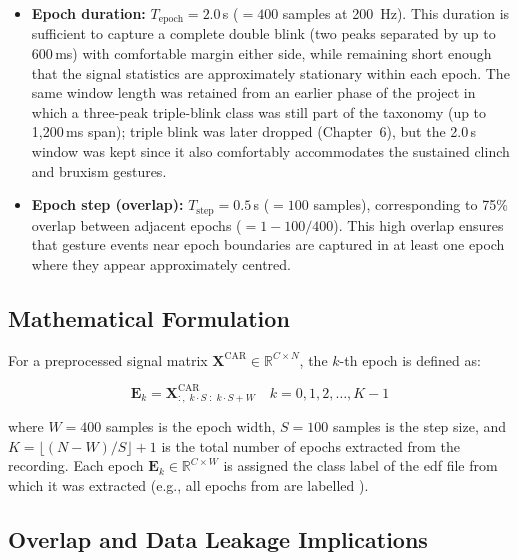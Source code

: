\begin{itemize}[leftmargin=*]
    \item \textbf{Epoch duration:} $T_{\text{epoch}} =
    2.0$\,s ($= 400$ samples at \SI{200}{\hertz}). This
    duration is sufficient to capture a complete double blink
    (two peaks separated by up to 600\,ms) with comfortable
    margin either side, while remaining short enough that the
    signal statistics are approximately stationary within each
    epoch. The same window length was retained from an earlier
    phase of the project in which a three-peak triple-blink
    class was still part of the taxonomy (up to 1{,}200\,ms
    span); triple blink was later dropped
    (Chapter~6), but the 2.0\,s window was kept since it also
    comfortably accommodates the sustained clinch and bruxism
    gestures.

    \item \textbf{Epoch step (overlap):} $T_{\text{step}} =
    0.5$\,s ($= 100$ samples), corresponding to 75\% overlap
    between adjacent epochs ($= 1 - 100/400$). This high
    overlap ensures that gesture events near epoch boundaries
    are captured in at least one epoch where they appear
    approximately centred.
\end{itemize}

\subsection{Mathematical Formulation}

For a preprocessed signal matrix $\mathbf{X}^{\text{CAR}}
\in \mathbb{R}^{C \times N}$, the $k$-th epoch is defined as:

\begin{equation}
\mathbf{E}_k = \mathbf{X}^{\text{CAR}}_{:,\;
k \cdot S \;:\; k \cdot S + W}
\quad k = 0, 1, 2, \ldots, K-1
\label{eq:epoch}
\end{equation}

\noindent where $W = 400$ samples is the epoch width,
$S = 100$ samples is the step size, and
$K = \lfloor (N - W) / S \rfloor + 1$ is the total
number of epochs extracted from the recording. Each epoch
$\mathbf{E}_k \in \mathbb{R}^{C \times W}$ is assigned the
class label of the \acrshort{edf} file from which it was
extracted (e.g., all epochs from  are
labelled ).

\subsection{Overlap and Data Leakage Implications}

